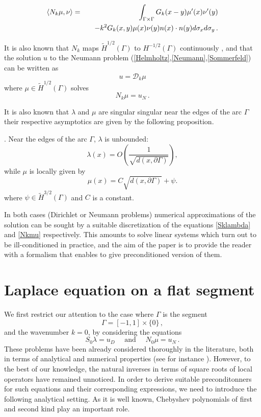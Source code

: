 \documentclass[a4paper]{article}
\begin{document}
\begin{eqnarray}
\label{NkenfonctiondeSk}
\left\langle N_k \mu,\nu\right\rangle &=& \int_{\Gamma\times \Gamma} G_k(x-y) \mu'(x) \nu'(y) \nonumber\\
&& \quad - k^2 G_k(x,y) \mu(x) \nu(y) n(x) \cdot n(y) d\sigma_x d\sigma_y\,.
\end{eqnarray}


It is also known that $N_k$ maps $\tilde{H}^{1/2}(\Gamma)$ to $H^{-1/2}(\Gamma)$ continuously \cite[Theorem 1.4]{wendland1990hypersingular}, and that the solution $u$ to the Neumann 
problem (\ref{Helmholtz},\ref{Neumann},\ref{Sommerfeld}) can be written as
\begin{equation}
	u = \mathcal{D}_k \mu
\end{equation}
where $\mu \in \tilde{H}^{1/2}(\Gamma)$ solves
\begin{equation}
	N_k \mu = u_N\,.
	\label{Nkmu}
\end{equation}  

It is also known that $\lambda$ and $\mu$ are singular singular near the edges of the arc $\Gamma$ their 
respective asymptotics are given by the following proposition.
 
\begin{proposition}
\cite{stephan1984augmented,wendland1990hypersingular,monch1996numerical}.
Near the edges of the arc $\Gamma$, $\lambda$ is unbounded:
	\[\lambda(x) = O\left(\frac{1}{\sqrt{d(x,\partial \Gamma)}}\right),\]
while $\mu$ is locally given by
	\[\mu(x) = C\sqrt{d(x,\partial \Gamma)} + \psi.\]
	where $\psi \in \tilde{H}^{3/2}(\Gamma)$ and $C$ is a constant.
\end{proposition}

In both cases (Dirichlet or Neumann problems) numerical approximations of the solution can be sought by a suitable 
discretization of the equations \eqref{Sklambda} and \eqref{Nkmu} respectively. This amounts to solve linear systems
which turn out to be ill-conditioned in practice, and the aim of the paper is to provide the reader with a formalism that 
enables to give preconditioned version of them.

	
\section{Laplace equation on a flat segment}

We first restrict our attention to the case where $\Gamma$ is the segment  
\[\Gamma = [-1,1] \times \{0\}\,,\]
and the wavenumber 
$k=0$, by considering the equations 
\[S_0\lambda = u_D \quad \text{ and } \quad N_0\mu = u_N\,.\]
These problems have been already considered thoroughly in the literature, both
in terms of analytical and numerical properties (see for instance \cite{jiang2004second,bruno2012second}). However, 
to the best of our knowledge, the natural inverses in terms of square roots of local operators have remained unnoticed. 
In order to derive suitable preconditonners for such equations and their corresponding expressions, we need to introduce 
the following analytical setting. As it is well known, Chebyshev polynomials of first and second kind play an important role.
\end{document}
